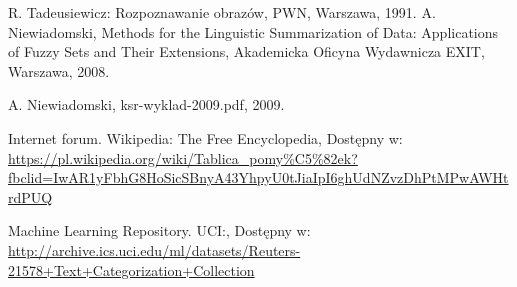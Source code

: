 \documentclass{classrep}
\begin{document}
\begin{thebibliography}{0}
 R. Tadeusiewicz: Rozpoznawanie obrazów, PWN, Warszawa, 1991.  
 A. Niewiadomski, Methods for the Linguistic Summarization of Data: Applications of Fuzzy Sets and Their Extensions, Akademicka Oficyna Wydawnicza EXIT, Warszawa, 2008.

 A. Niewiadomski, ksr-wyklad-2009.pdf, 2009.

 Internet forum. Wikipedia: The Free Encyclopedia, Dostępny w: \url{https://pl.wikipedia.org/wiki/Tablica_pomy%C5%82ek?fbclid=IwAR1yFbhG8HoSicSBnyA43YhpyU0tJiaIpI6ghUdNZvzDhPtMPwAWHtrdPUQ}

 Machine Learning Repository. UCI:, Dostępny w: \url{http://archive.ics.uci.edu/ml/datasets/Reuters-21578+Text+Categorization+Collection}

\end{thebibliography}
\end{document}
